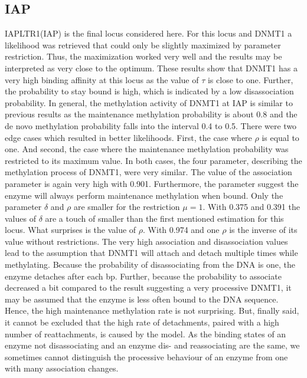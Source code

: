 \subsection{IAP}
\label{IAP}
IAPLTR1(IAP) is the final locus considered here. For this locus and DNMT1 a likelihood was retrieved that could only be slightly maximized by parameter restriction. Thus, the maximization worked very well and the results may be interpreted as very close to the optimum. These results show that DNMT1 has a very high binding affinity at this locus as the value of $\tau$ is close to one. Further, the probability to stay bound is high, which is indicated by a low disassociation probability. In general, the methylation activity of DNMT1 at IAP is similar to previous results as the maintenance methylation probability is about 0.8 and the de novo methylation probability falls into the interval 0.4 to 0.5.\newline
There were two edge cases which resulted in better likelihoods. First, the case where $\rho$ is equal to one. And second, the case where the maintenance methylation probability was restricted to its maximum value. In both cases, the four parameter, describing the methylation process of DNMT1, were very similar. The value of the association parameter is again very high with 0.901. Furthermore, the parameter suggest the enzyme will always perform maintenance methylation when bound. Only the parameter $\delta$ and $\rho$ are smaller for the restriction $\mu = 1$. With 0.375 and 0.391 the values of $\delta$ are a touch of smaller than the first mentioned estimation for this locus. What surprises is the value of $\rho$. With 0.974 and one $\rho$ is the inverse of its value without restrictions. The very high association and disassociation values lead to the assumption that DNMT1 will attach and detach multiple times while methylating. Because the probability of disassociating from the DNA is one, the enzyme detaches after each \ac{bp}. Further, because the probability to associate decreased a bit compared to the result suggesting a very processive DNMT1, it may be assumed that the enzyme is less often bound to the DNA sequence. Hence, the high maintenance methylation rate is not surprising. But, finally said, it cannot be excluded that the high rate of detachments, paired with a high number of reattachments, is caused by the model. As the binding states of an enzyme not disassociating and an enzyme dis- and reassociating are the same, we sometimes cannot distinguish the processive behaviour of an enzyme from one with many association changes.\\

